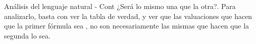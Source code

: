 \begin{frame}{Análisis del lenguaje natural - Cont}
  ¿Será lo mismo una que la otra?. Para analizarlo, basta con ver la tabla de
  verdad, y ver que las valuaciones que hacen que la primer fórmula sea \fulltrue,
  no son necesariamente las mismas que hacen que la segunda lo sea.
  \jump
  \begin{columns}
  \end{columns}
\end{frame}

